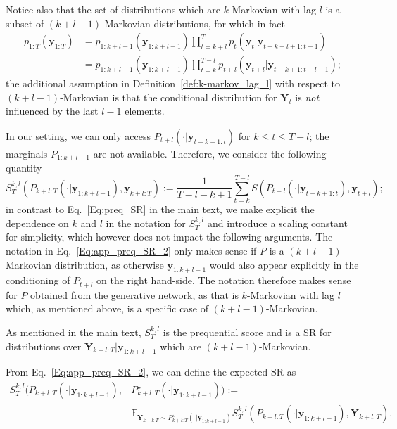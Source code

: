 \documentclass[twoside,11pt]{article}
\newcommand{\E}{\mathbb{E}}
\newcommand{\ddobs}{\mathbf{y}}
\newcommand{\Ddobs}{\mathbf{Y}}
\newcommand{\ddobsuptminus}{\mathbf{y}_{t-k+1:t}}
\begin{document}
	Notice also that the set of distributions which are $ k $-Markovian with lag $ l $ is a subset of $ (k+l-1) $-Markovian distributions, for which in fact
	\begin{equation}\label{}
	\begin{aligned}
	p_{1:T}(\ddobs_{1:T}) &= p_{1:k+l-1}(\ddobs_{1:k+l-1})\prod_{t=k+l}^{T}p_{t}(\ddobs_{t}|\ddobs_{{t-k-l+1}:{t-1}})\\
	&= p_{1:k+l-1}(\ddobs_{1:k+l-1})\prod_{t=k}^{T-l}p_{t+l}(\ddobs_{t+l}|\ddobs_{{t-k+1}:{t+l-1}});
	\end{aligned}
	\end{equation}
	the additional assumption in Definition~\ref{def:k-markov_lag_l} with respect to $ (k+l-1) $-Markovian is that the conditional distribution for $ \Ddobs_t $ is \textit{not} influenced by the last $ l-1 $ elements.
	
	
	
	
	In our setting, we can only access $ P_{t+l}(\cdot|\ddobsuptminus) $ for $ k\le t\le T-l $; the marginals $ P_{1:k+l-1} $ are not available. Therefore, we consider the following quantity
	\begin{equation}\label{Eq:app_preq_SR_2}
	S_T^{k,l} (P_{k+l:T}(\cdot|\ddobs_{1:k+l-1}), \ddobs_{k+l:T}):= \frac{1}{T-l-k+1}\sum\limits_{t=k}^{T-l}S(P_{t+l}(\cdot|\ddobs_{t-k+1:t}),\ddobs_{t+l});
	\end{equation}
	in contrast to Eq.~\eqref{Eq:preq_SR} in the main text, we make explicit the dependence on $ k $ and $ l $ in the notation for $ S_T^{k,l} $ and introduce a scaling constant for simplicity, which however does not impact the following arguments.
	The notation in Eq.~\eqref{Eq:app_preq_SR_2} only makes sense if $ P $ is a $ (k+l-1) $-Markovian distribution, as otherwise $ \ddobs_{1:k+l-1} $ would also appear explicitly in the conditioning of $ P_{t+l} $ on the right hand-side. The notation therefore makes sense for $ P $ obtained from the generative network, as that is $ k $-Markovian with lag $ l $ which, as mentioned above, is a specific case of $ (k+l-1) $-Markovian.
	
	
	
	
	
	As mentioned in the main text, $ S_T^{k,l} $ is the prequential score and is a SR for distributions over $ \Ddobs_{k+l:T}| \ddobs_{1:k+l-1}$ which are $ (k+l-1) $-Markovian.
	
	
	
	
	
	From Eq.~\eqref{Eq:app_preq_SR_2}, we can define the expected SR as
	\begin{equation}\label{Eq:app_preq_SR_2_exp}
	\begin{aligned}
	S_T^{k,l} (P_{k+l:T}(\cdot|\ddobs_{1:k+l-1}), &P^\star_{k+l:T}(\cdot|\ddobs_{1:k+l-1})):=\\
	&\E_{\Ddobs_{k+l:T}\sim P^\star_{k+l:T}(\cdot|\ddobs_{1:k+l-1})} S_T^{k,l} (P_{k+l:T}(\cdot|\ddobs_{1:k+l-1}), \Ddobs_{k+l:T}).
	\end{aligned}
	\end{equation}
	
\end{document}
